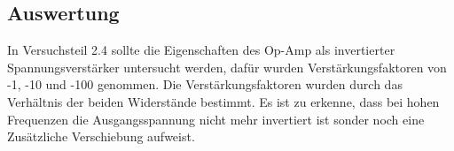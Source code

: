 \documentclass[12pt,a4paper]{article}
\begin{document}
\subsection{Auswertung}

In Versuchsteil 2.4 sollte die Eigenschaften des Op-Amp als invertierter Spannungsverstärker untersucht werden, dafür wurden Verstärkungsfaktoren von -1, -10 und -100 genommen. Die Verstärkungsfaktoren wurden durch das Verhältnis der beiden Widerstände bestimmt.
Es ist zu erkenne, dass bei hohen Frequenzen die Ausgangsspannung nicht mehr invertiert ist sonder noch eine Zusätzliche Verschiebung aufweist.
\end{document}
